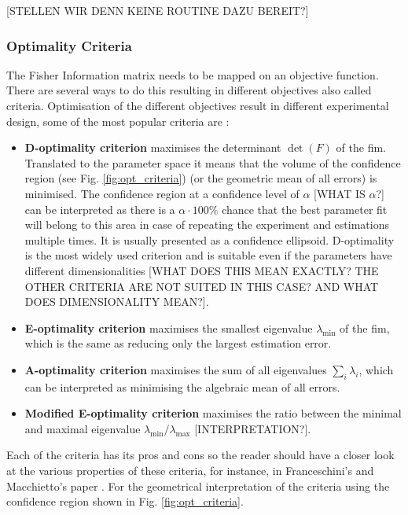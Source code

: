 \documentclass[10pt,A4paper]{article}
\begin{document}
[STELLEN WIR DENN KEINE ROUTINE DAZU BEREIT?]
%
\subsubsection*{Optimality Criteria}
The Fisher Information matrix needs to be mapped on an objective function. There are several ways to do this resulting in different objectives also called criteria. 
Optimisation of the different objectives result in different experimental design, some of the most popular criteria are \cite{}:
\begin{itemize}
 \item \textbf{D-optimality criterion} maximises the determinant $\det (F)$ of the \ac{fim}. 
 Translated to the parameter space it means that the volume of the confidence region (see Fig. \ref{fig:opt_criteria}) (or the geometric mean of all errors) is minimised. 
 The confidence region at a confidence level of $\alpha$ [WHAT IS $\alpha$?] can be interpreted as there is a $\alpha \cdot 100 \%$ chance that the best parameter fit will belong to this area in case of repeating the experiment and estimations multiple times. 
 It is usually presented as a confidence ellipsoid. D-optimality is the most widely used criterion and is suitable even if the parameters have different dimensionalities [WHAT DOES THIS MEAN EXACTLY? THE OTHER CRITERIA ARE NOT SUITED IN THIS CASE? AND WHAT DOES DIMENSIONALITY MEAN?].    
\item \textbf{E-optimality criterion} maximises the smallest eigenvalue $\lambda_{\min}$ of the \ac{fim}, which is the same as reducing only the largest estimation error. 
\item \textbf{A-optimality criterion} maximises the sum of all eigenvalues $\sum_i \lambda_i$, which can be interpreted as minimising the algebraic mean of all errors.
 \item \textbf{Modified E-optimality criterion} maximises the ratio between the minimal and maximal eigenvalue $\lambda_{\min} / \lambda_{\max}$ [INTERPRETATION?].
\end{itemize}
Each of the criteria has its pros and cons so the reader should have a closer look at the various properties of these criteria, for instance, in Franceschini's and Macchietto's paper \cite{franceschiniModelbasedDesignExperiments2008}. 
For the geometrical interpretation of the criteria using the confidence region shown in Fig. \ref{fig:opt_criteria}.
\end{document}

